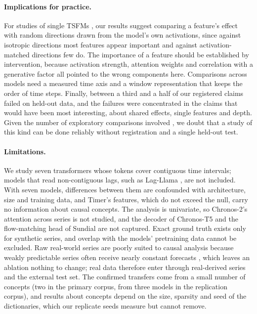 \documentclass[twoside,11pt]{article}
\begin{document}
\paragraph{Implications for practice.}
For studies of single TSFMs \citep{mishra2026dissecting,oublal2026timesae,divo2026zeitgeist}, our results suggest comparing a feature's effect with random directions drawn from the model's own activations, since against isotropic directions most features appear important and against activation-matched directions few do.
The importance of a feature should be established by intervention, because activation strength, attention weights and correlation with a generative factor all pointed to the wrong components here.
Comparisons across models need a measured time axis and a window representation that keeps the order of time steps.
Finally, between a third and a half of our registered claims failed on held-out data, and the failures were concentrated in the claims that would have been most interesting, about shared effects, single features and depth.
Given the number of exploratory comparisons involved \citep{gelman2014garden}, we doubt that a study of this kind can be done reliably without registration and a single held-out test.

\paragraph{Limitations.}
\label{sec:limitations}
We study seven transformers whose tokens cover contiguous time intervals; models that read non-contiguous lags, such as Lag-Llama \citep{rasul2023lagllama}, are not included.
With seven models, differences between them are confounded with architecture, size and training data, and Timer's features, which do not exceed the null, carry no information about causal concepts.
The analysis is univariate, so Chronos-2's attention across series is not studied, and the decoder of Chronos-T5 and the flow-matching head of Sundial are not captured.
Exact ground truth exists only for synthetic series, and overlap with the models' pretraining data cannot be excluded.
Raw real-world series are poorly suited to causal analysis because weakly predictable series often receive nearly constant forecasts \citep{wan2026collapse}, which leaves an ablation nothing to change; real data therefore enter through real-derived series and the external test set.
The confirmed transfers come from a small number of concepts (two in the primary corpus, from three models in the replication corpus), and results about concepts depend on the size, sparsity and seed of the dictionaries, which our replicate seeds measure but cannot remove.
\end{document}
